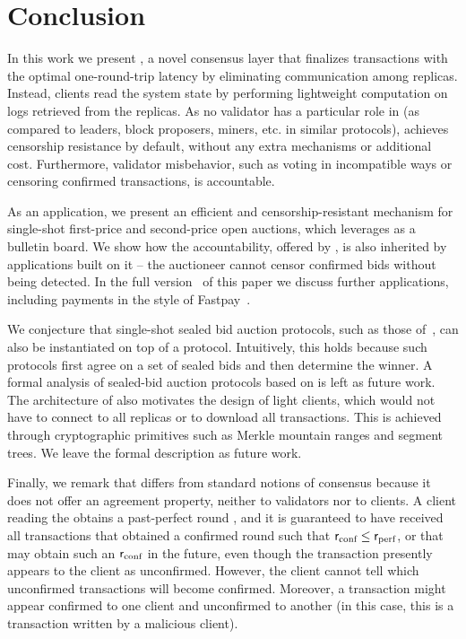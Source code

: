 \section{Conclusion}
In this work we present \podtm, a novel consensus layer that finalizes transactions with the optimal one-round-trip latency by eliminating communication among replicas. Instead, clients read the system state by performing lightweight computation on logs retrieved from the replicas. As no validator has a particular role in \podtm (as compared to leaders, block proposers, miners, etc. in similar protocols), \podtm achieves censorship resistance by default, without any extra mechanisms or additional cost. Furthermore, validator misbehavior, such as voting in incompatible ways or censoring confirmed transactions, is accountable.

As an application, we present an efficient and censorship-resistant mechanism for single-shot first-price and second-price open auctions, which leverages \podtm as a bulletin board.
We show how the accountability, offered by \podtm, is also inherited by applications built on it -- the auctioneer cannot censor confirmed bids without being detected.
In the full version~\cite{DBLP:journals/corr/abs-2501-14931} of this paper we discuss further applications, including payments in the style of Fastpay~\cite{DBLP:conf/aft/BaudetDS20}.

We conjecture that single-shot sealed bid auction protocols, such as those of~\cite{trustee,seal,ACNS:DavGenPou22,CCS:TAFWBM23,chitra_et_al:LIPIcs.AFT.2024.19,cryptoeprint:2024/1011}, can also be instantiated on top of a \bidsettm protocol. Intuitively, this holds because such protocols first agree on a set of sealed bids and then determine the winner. A formal analysis of sealed-bid auction protocols based on \bidsettm is left as future work.
The architecture of \podtm also motivates the design of light clients, which would not have to connect to all replicas or to download all transactions. This is achieved through cryptographic primitives such as Merkle mountain ranges and segment trees. We leave the formal description as future work.

Finally, we remark that \podtm differs from standard notions of consensus because it does not offer an agreement property, neither to validators nor to clients. A client reading the \podtm obtains a past-perfect round \rperf, and it is guaranteed to have received all transactions that obtained a confirmed round \rconf such that $\textsf{r}_\text{conf} \leq \textsf{r}_\text{perf}$, or that may obtain such an $\textsf{r}_\text{conf}$ in the future, even though the transaction presently appears to the client as unconfirmed. However, the client cannot tell which unconfirmed transactions will become confirmed. Moreover, a transaction might appear confirmed to one client and unconfirmed to another (in this case, this is a transaction written by a malicious client).